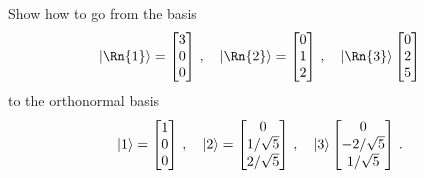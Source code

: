 \begin{exercise}
Show how to go from the basis
\begin{equation}
    \ket{\Rn{1}} = 
    \begin{bmatrix}
    3 \\
    0 \\
    0
    \end{bmatrix}\,,
    \quad
    \ket{\Rn{2}} = 
    \begin{bmatrix}
    0 \\
    1 \\
    2
    \end{bmatrix}\,,
    \quad
    \ket{\Rn{3}}
    \begin{bmatrix}
    0 \\
    2 \\
    5
    \end{bmatrix}
\end{equation}
to the orthonormal basis
\begin{equation}
    \ket{1} = 
    \begin{bmatrix}
    1 \\
    0 \\
    0
    \end{bmatrix}\,,
    \quad
    \ket{2} = 
    \begin{bmatrix}
    0 \\
    1/\sqrt{5} \\
    2/\sqrt{5}
    \end{bmatrix}\,,
    \quad
    \ket{3}
    \begin{bmatrix}
    0 \\
    -2/\sqrt{5} \\
    1/\sqrt{5}
    \end{bmatrix}\,.
\end{equation}
\end{exercise}

